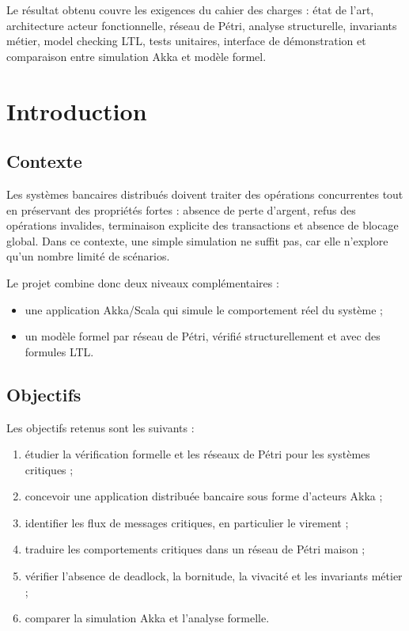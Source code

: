 \documentclass[11pt,a4paper]{article}
\begin{document}
Le résultat obtenu couvre les exigences du cahier des charges : état de l'art, architecture acteur fonctionnelle, réseau de Pétri, analyse structurelle, invariants métier, model checking LTL, tests unitaires, interface de démonstration et comparaison entre simulation Akka et modèle formel.

\section{Introduction}

\subsection{Contexte}

Les systèmes bancaires distribués doivent traiter des opérations concurrentes tout en préservant des propriétés fortes : absence de perte d'argent, refus des opérations invalides, terminaison explicite des transactions et absence de blocage global. Dans ce contexte, une simple simulation ne suffit pas, car elle n'explore qu'un nombre limité de scénarios.

Le projet combine donc deux niveaux complémentaires :
\begin{itemize}[leftmargin=*]
  \item une application Akka/Scala qui simule le comportement réel du système ;
  \item un modèle formel par réseau de Pétri, vérifié structurellement et avec des formules LTL.
\end{itemize}

\subsection{Objectifs}

Les objectifs retenus sont les suivants :
\begin{enumerate}[leftmargin=*]
  \item étudier la vérification formelle et les réseaux de Pétri pour les systèmes critiques ;
  \item concevoir une application distribuée bancaire sous forme d'acteurs Akka ;
  \item identifier les flux de messages critiques, en particulier le virement ;
  \item traduire les comportements critiques dans un réseau de Pétri maison ;
  \item vérifier l'absence de deadlock, la bornitude, la vivacité et les invariants métier ;
  \item comparer la simulation Akka et l'analyse formelle.
\end{enumerate}
\end{document}
